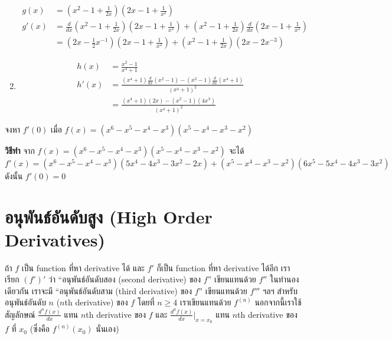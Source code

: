 \documentclass[
]{book}
\begin{document}
\begin{enumerate}
\begin{equation}
\begin{aligned}
              g(x) &= \left( x^2 - 1 + \frac{1}{2x} \right) \left(2x - 1 + \frac{1}{x^2} \right) \\
              g'(x) &= \frac{d}{dx}\left( x^2 - 1 + \frac{1}{2x} \right)\left(2x - 1 + \frac{1}{x^2} \right)
              +  \left( x^2 - 1 + \frac{1}{2x} \right) \frac{d}{dx} \left(2x - 1 + \frac{1}{x^2} \right)\\
                  &= \left(2x - \frac{1}{2}x^{-1} \right)\left(2x - 1 + \frac{1}{x^2} \right)
              +  \left( x^2 - 1 + \frac{1}{2x} \right) \left(2x -2x^{-3} \right)
    \end{aligned} \end{equation}
\item
  \begin{equation}   \begin{aligned}
   h(x) &= \frac{x^2 -1}{x^4 + 1} \\
          h'(x) &= \frac{(x^4 + 1) \frac{d}{dx}(x^2 -1) - (x^2 -1)\frac{d}{dx}(x^4 + 1)   }{(x^4 + 1)^2}\\
          &= \frac{(x^4 + 1) (2x) - (x^2 -1)(4x^3)   }{(x^4 + 1)^2}
    \end{aligned} \end{equation}
\end{enumerate}

จงหา \(f'(0)\) เมื่อ \(f(x) = (x^6 - x^5-x^4-x^3)(x^5-x^4-x^3-x^2)\)

\textbf{วิธีทำ} จาก \(f(x) = (x^6 - x^5-x^4-x^3)(x^5-x^4-x^3-x^2)\) จะได้
\[f'(x) = (x^6 - x^5-x^4-x^3)(5x^4-4x^3-3x^2-2x) +
    (x^5-x^4-x^3-x^2)(6x^5 - 5x^4-4x^3-3x^2)\] ดังนั้น \(f'(0) = 0\)

\section{อนุพันธ์อันดับสูง (High Order
Derivatives)}\label{uxe2duxe19uxe1euxe19uxe18uxe2duxe19uxe14uxe1auxe2auxe07-high-order-derivatives}

ถ้า \(f\) เป็น function ที่หา derivative ได้ และ \(f'\) ก็เป็น function ที่หา
derivative ได้อีก เราเรียก \((f')'\) ว่า ``อนุพันธ์อันดับสอง (second derivative)
ของ \(f\)'' เขียนแทนด้วย \(f''\) ในทำนองเดียวกัน เราจะมี ``อนุพันธ์อันดับสาม
(third derivative) ของ \(f\)'' เขียนแทนด้วย \(f'''\) ฯลฯ สำหรับอนุพันธ์อันดับ
\(n\) (\(n\)th derivative) ของ \(f\) โดยที่ \(n \ge 4\) เราเขียนแทนด้วย
\(f^{(n)}\) นอกจากนี้เราใช้สัญลักษณ์ \(\frac{d^nf(x)}{dx}\) แทน \(n\)th
derivative ของ \(f\) และ \(\frac{d^nf(x)}{dx}|_{x=x_0}\) แทน \(n\)th
derivative ของ \(f\) ที่ \(x_0\) (ซึ่งคือ \(f^{(n)}(x_0)\) นั่นเอง)
\end{document}
